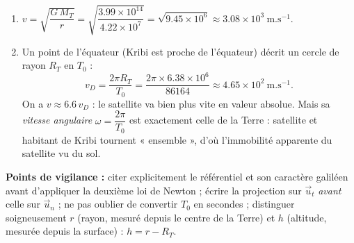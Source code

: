 \documentclass[11pt]{article}
\begin{document}
\begin{corrige}
\begin{enumerate}
\begin{enumerate}
\item Le mouvement étant uniforme, $v = \dfrac{2\pi r}{T}$. En égalant avec $v^2 = \dfrac{G\,M_T}{r}$ :
\[ \dfrac{4\pi^2 r^2}{T^2} = \dfrac{G\,M_T}{r} \quad\Longrightarrow\quad \dfrac{T^2}{r^3} = \dfrac{4\pi^2}{G\,M_T}. \]
\item On en tire $r^3 = \dfrac{G\,M_T\,T_0^2}{4\pi^2}$, soit
\[ r = \left(\dfrac{G\,M_T\,T_0^2}{4\pi^2}\right)^{1/3}. \]
Toutes les grandeurs du membre de droite sont fixées ($G$, $M_T$, $T_0$) : le rayon est \textbf{unique}, donc l'altitude $h = r - R_T$ est unique.
\[ r^3 = \dfrac{\num{3,99}\times 10^{14} \times (\num{86164})^2}{39,48} = \dfrac{\num{3,99}\times 10^{14} \times \num{7,42}\times 10^{9}}{39,48} = \num{7,50}\times 10^{22}\ \mathrm{m^3} \]
\[ r \approx \num{4,22}\times 10^{7}\ \mathrm{m} \quad\Longrightarrow\quad h = r - R_T \approx \num{4,22}\times 10^{7} - \num{6,38}\times 10^{6} \approx \num{3,58}\times 10^{7}\ \mathrm{m} \approx \num{35800}\ \mathrm{km}. \]
\end{enumerate}
\item $v = \sqrt{\dfrac{G\,M_T}{r}} = \sqrt{\dfrac{\num{3,99}\times 10^{14}}{\num{4,22}\times 10^{7}}} = \sqrt{\num{9,45}\times 10^{6}} \approx \num{3,08}\times 10^{3}\ \mathrm{m.s^{-1}}$.
\item Un point de l'équateur (Kribi est proche de l'équateur) décrit un cercle de rayon $R_T$ en $T_0$ :
\[ v_D = \dfrac{2\pi R_T}{T_0} = \dfrac{2\pi \times \num{6,38}\times 10^{6}}{\num{86164}} \approx \num{4,65}\times 10^{2}\ \mathrm{m.s^{-1}}. \]
On a $v \approx \num{6,6}\,v_D$ : le satellite va bien plus vite en valeur absolue. Mais sa \emph{vitesse angulaire} $\omega = \dfrac{2\pi}{T_0}$ est exactement celle de la Terre : satellite et habitant de Kribi tournent « ensemble », d'où l'immobilité apparente du satellite vu du sol.
\end{enumerate}
\textbf{Points de vigilance :} citer explicitement le référentiel et son caractère galiléen avant d'appliquer la deuxième loi de Newton ; écrire la projection sur $\vec{u}_t$ \emph{avant} celle sur $\vec{u}_n$ ; ne pas oublier de convertir $T_0$ en secondes ; distinguer soigneusement $r$ (rayon, mesuré depuis le centre de la Terre) et $h$ (altitude, mesurée depuis la surface) : $h = r - R_T$.
\end{corrige}
\end{document}
